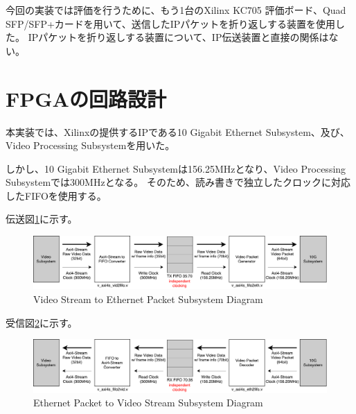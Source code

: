 今回の実装では評価を行うために、もう1台のXilinx KC705 評価ボード、Quad SFP/SFP+カードを用いて、送信したIPパケットを折り返しする装置を使用した。
IPパケットを折り返しする装置について、IP伝送装置と直接の関係はない。

\section{FPGAの回路設計}

本実装では、Xilinxの提供するIPである10 Gigabit Ethernet Subsystem\cite{xilinx-pg157}、及び、Video Processing Subsystem\cite{xilinx-pg230}を用いた。

しかし、10 Gigabit Ethernet Subsystemは156.25MHzとなり、Video Processing Subsystemでは300MHzとなる。
そのため、読み書きで独立したクロックに対応したFIFOを使用する。

伝送図\ref{fig:fpga-video-ethernet-diagram}に示す。

\begin{figure}[htbp]
  \begin{center}
    \includegraphics[bb=0 0 911 166,width=15.5cm]{img/fpga-video-ethernet-diagram.pdf}
  \end{center}
  \caption{Video Stream to Ethernet Packet Subsystem Diagram}
  \label{fig:fpga-video-ethernet-diagram}
\end{figure}

受信図\ref{fig:fpga-ethernet-video-diagram}に示す。

\begin{figure}[htbp]
  \begin{center}
    \includegraphics[bb=0 0 911 166,width=15.5cm]{img/fpga-ethernet-video-diagram.pdf}
  \end{center}
  \caption{Ethernet Packet to Video Stream Subsystem Diagram}
  \label{fig:fpga-ethernet-video-diagram}
\end{figure}

